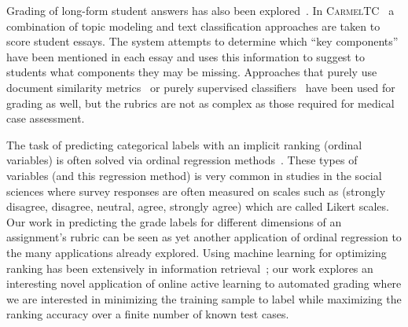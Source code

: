Grading of long-form student answers has also been
explored~\cite{Balfour:2013}. In
\textsc{CarmelTC}~\cite{Rose:2003:HLT-NAACL-EDUC} a combination of topic
modeling and text classification approaches are taken to score student
essays. The system attempts to determine which ``key components'' have been
mentioned in each essay and uses this information to suggest to students
what components they may be missing. Approaches that purely use document
similarity metrics~\cite{Duwairi:2006:CHB} or purely supervised
classifiers~\cite{Larkey:1998:SIGIR} have been used for grading as well,
but the rubrics are not as complex as those required for medical case
assessment.

The task of predicting categorical labels with an implicit ranking (ordinal
variables) is often solved via ordinal regression
methods~\cite{McCullagh:1980}. These types of variables (and this
regression method) is very common in studies in the social sciences where
survey responses are often measured on scales such as (strongly disagree,
disagree, neutral, agree, strongly agree) which are called Likert
scales. Our work in predicting the grade labels for different dimensions of
an assignment's rubric can be seen as yet another application of ordinal
regression to the many applications already explored. Using machine
learning for optimizing ranking has been extensively in information
retrieval~\cite{Liu:2009}; our work explores an interesting novel
application of online active learning to automated grading where we are
interested in minimizing the training sample to label while maximizing the
ranking accuracy over a finite number of known test cases.  
